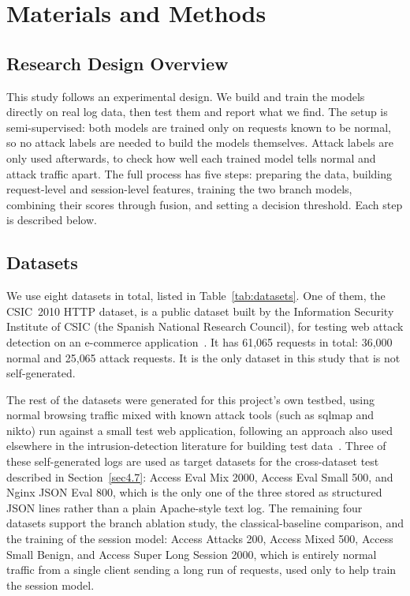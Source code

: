 \documentclass[futureinternet,article,accept,moreauthors]{Definitions/mdpi}
\begin{document}
\section{Materials and Methods} \label{sec4}

\subsection{Research Design Overview}

This study follows an experimental design. We build and train the models directly on real log data, then test them and report what we find. The setup is semi-supervised: both models are trained only on requests known to be normal, so no attack labels are needed to build the models themselves. Attack labels are only used afterwards, to check how well each trained model tells normal and attack traffic apart. The full process has five steps: preparing the data, building request-level and session-level features, training the two branch models, combining their scores through fusion, and setting a decision threshold. Each step is described below.

\subsection{Datasets} \label{sec4.2}

We use eight datasets in total, listed in Table~\ref{tab:datasets}. One of them, the CSIC~2010 HTTP dataset, is a public dataset built by the Information Security Institute of CSIC (the Spanish National Research Council), for testing web attack detection on an e-commerce application~\cite{csic2010}. It has 61{,}065 requests in total: 36{,}000 normal and 25{,}065 attack requests. It is the only dataset in this study that is not self-generated.

The rest of the datasets were generated for this project's own testbed, using normal browsing traffic mixed with known attack tools (such as sqlmap and nikto) run against a small test web application, following an approach also used elsewhere in the intrusion-detection literature for building test data~\cite{shiravi2012}. Three of these self-generated logs are used as target datasets for the cross-dataset test described in Section~\ref{sec4.7}: Access Eval Mix 2000, Access Eval Small 500, and Nginx JSON Eval 800, which is the only one of the three stored as structured JSON lines rather than a plain Apache-style text log. The remaining four datasets support the branch ablation study, the classical-baseline comparison, and the training of the session model: Access Attacks 200, Access Mixed 500, Access Small Benign, and Access Super Long Session 2000, which is entirely normal traffic from a single client sending a long run of requests, used only to help train the session model.
\end{document}
